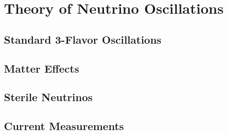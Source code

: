 \chapter{Theory of Neutrino Oscillations}
\label{ch:Theory}

\section{Standard 3-Flavor Oscillations}

\section{Matter Effects}

\section{Sterile Neutrinos}

\section{Current Measurements}